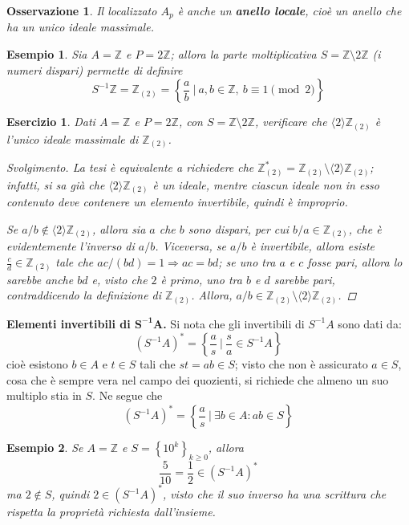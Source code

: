 \documentclass[12pt]{scrartcl}
\theoremstyle{style}
\newtheorem{esempio}{Esempio}[section]
\newtheorem{osservazione}{Osservazione}[section]
\newtheorem{esercizio}{Esercizio}[section]
\newenvironment{svolgimento}{\renewcommand\qedsymbol{$\blacksquare$}\begin{proof}[Svolgimento]}{\end{proof}}
\numberwithin{equation}{subsection}
\renewcommand{\textbf}[1]{\textsf{\bfseries #1}}
\begin{document}
\begin{osservazione}
Il localizzato $A_p$ \`e anche un \textbf{anello locale}, cio\`e un anello che ha un unico ideale massimale.
\end{osservazione}
\begin{esempio}
Sia $A = \mathbb{Z}$ e $P = 2\mathbb{Z}$; allora la parte moltiplicativa $S = \mathbb{Z} \setminus 2\mathbb{Z}$ (i numeri dispari) permette di definire
\[
S^{-1}\mathbb{Z} = \mathbb{Z}_{(2)} = \left\{ \frac{a}{b} \ \bigg\lvert \ a, b\in \mathbb{Z}, \ b \equiv 1  \pmod{2}  \right\} 
\] 
\end{esempio}
\begin{esercizio}
	Dati $A = \mathbb{Z}$ e $P =2\mathbb{Z}$, con $S = \mathbb{Z} \setminus 2\mathbb{Z}$, verificare che $\langle 2 \rangle\mathbb{Z}_{(2)}$ \`e l'unico ideale massimale di $\mathbb{Z}_{(2)} $.
	\begin{svolgimento}
		La tesi \`e equivalente a richiedere che $\mathbb{Z}_{(2)} ^* = \mathbb{Z}_{(2)} \setminus\langle 2 \rangle\mathbb{Z}_{(2)} $; infatti, si sa gi\`a che $\langle 2 \rangle\mathbb{Z}_{(2)} $ \`e un ideale, mentre ciascun ideale non in esso contenuto deve contenere un elemento invertibile, quindi \`e improprio.

		Se $a / b \not \in \langle 2 \rangle\mathbb{Z}_{(2)} $, allora sia $a$ che $b$ sono dispari, per cui $b/a \in \mathbb{Z}_{(2)} $, che \`e evidentemente l'inverso di $a / b$.
		Viceversa, se $a / b$ \`e invertibile, allora esiste $ \frac{c}{ d} \in \mathbb{Z}_(2)$ tale che $ac / (bd) =1 \Rightarrow ac = bd$; se uno tra $a$ e $c$ fosse pari, allora lo sarebbe anche $bd$ e, visto che $2$ \`e primo, uno tra $b$ e $d$ sarebbe pari, contraddicendo la definizione di $\mathbb{Z}_{(2)} $.
		Allora, $a / b \in \mathbb{Z}_{(2)} \setminus \langle 2 \rangle\mathbb{Z}_{(2)} $.
	\end{svolgimento}
\end{esercizio}

\textbf{Elementi invertibili di $\mathbf{S^{-1}A} $.} 
Si nota che gli invertibili di $S^{-1}A$ sono dati da:
\[
	(S^{-1}A)^* = \left\{ \frac{a}{s} \ \bigg\lvert \ \frac{s}{a} \in S^{-1}A \right\} 
\] 
cio\`e esistono $b \in A$ e $t \in S$ tali che $st =  ab \in S$; visto che non \`e assicurato $a \in S$, cosa che \`e sempre vera nel campo dei quozienti, si richiede che almeno un suo multiplo stia in $S$.
Ne segue che 
\[
	(S^{-1}A) ^* = \left\{ \frac{a}{s} \ \bigg\lvert \ \exists b \in A : ab \in S \right\} 
\] 
\begin{esempio}
Se $A = \mathbb{Z}$ e $S = \left\{ 10^k \right\} _{k\ge 0} $, allora 
\[
\frac{5}{10}= \frac{1}{2}\in (S^{-1}A)^*
\] 
ma $2 \not \in S$, quindi $2 \in (S^{-1}A)^*$, visto che il suo inverso ha una scrittura che rispetta la propriet\`a richiesta dall'insieme.
\end{esempio}
\end{document}
